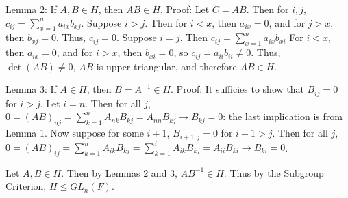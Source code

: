 \documentclass[12pt]{article}
\begin{document}
\begin{itemize}
Lemma 2: If $A, B \in H$, then $AB \in H$. Proof: Let $C = AB$. Then for $i, j$, $c_{ij} = \sum_{x = 1}^{n} a_{ix}b_{xj}$. Suppose $i > j$. Then for $i < x$, then $a_{ix} = 0$, and for $j > x$, then $b_{xj} = 0$. Thus, $c_{ij} = 0$. Suppose $i = j$. Then $c_{ij} = \sum_{x=1}^n a_{ix}b_{xi}$ For $i < x$, then $a_{ix} = 0$, and for $i > x$, then $b_{xi} = 0$, so $c_{ij} = a_{ii}b_{ii} \neq 0$. Thus, $\det(AB) \neq 0$, $AB$ is upper triangular, and therefore $AB \in H$.

Lemma 3: If $A \in H$, then $B = A^{-1} \in H$. Proof: 
It sufficies to show that $B_{ij} = 0$ for $i > j$. Let $i = n$. Then for all $j$, $0 = (AB)_{nj} = \sum_{k=1}^n A_{nk}B_{kj} = A_{nn}B_{kj} \rightarrow B_{kj} = 0$: the last implication is from Lemma 1. Now suppose for some $i + 1$, $B_{i+1, j} = 0$ for $i+1 > j$. Then for all $j$, $0 = (AB)_{ij} = \sum_{k=1}^n A_{ik}B_{kj} = \sum_{k=1}^i A_{ik}B_{kj} = A_{ii}B_{ki} \rightarrow B_{ki} = 0$.

Let $A, B \in H$. Then by Lemmas 2 and 3, $AB^{-1} \in H$. Thus by the Subgroup Criterion, $H \leq GL_n(F)$. 
\end{itemize}
\end{document}
